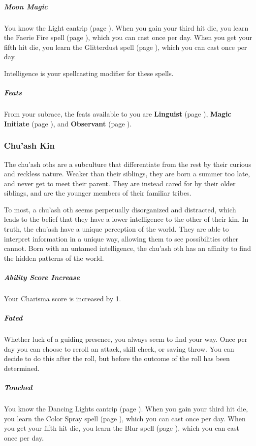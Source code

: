     \subparagraph{Moon Magic} You know the Light cantrip (page \pageref{spell::light}).
    When you gain your third hit die, you learn the Faerie Fire spell (page \pageref{spell::faeriefire}), which you can cast once per day.
    When you get your fifth hit die, you learn the Glitterdust spell (page \pageref{spell::glitterdust}), which you can cast once per day.

    Intelligence is your spellcasting modifier for these spells.

    \subparagraph{Feats} From your subrace, the feats available to you are
    \textbf{Linguist} (page \pageref{feat::linguist}),
    \textbf{Magic Initiate} (page \pageref{feat::magicinitiate}), and
    \textbf{Observant} (page \pageref{feat::observant}).

\subsubsection{Chu'ash Kin}
    The chu'ash oths are a subculture that differentiate from the rest by their curious and reckless nature.
    Weaker than their siblings, they are born a summer too late, and never get to meet their parent.
    They are instead cared for by their older siblings, and are the younger members of their familiar tribes.

    To most, a chu'ash oth seems perpetually disorganized and distracted, which leads to the belief that they have a lower intelligence to the other of their kin.
    In truth, the chu'ash have a unique perception of the world.
    They are able to interpret information in a unique way, allowing them to see possibilities other cannot.
    Born with an untamed intelligence, the chu'ash oth has an affinity to find the hidden patterns of the world.

    \subparagraph{Ability Score Increase} Your Charisma score is increased by 1.

    \subparagraph{Fated} Whether luck of a guiding presence, you always seem to find your way.
    Once per day you can choose to reroll an attack, skill check, or saving throw.
    You can decide to do this after the roll, but before the outcome of the roll has been determined.

    \subparagraph{Touched} You know the Dancing Lights cantrip (page \pageref{spell::dancinglights}).
    When you gain your third hit die, you learn the Color Spray spell (page \pageref{spell::colorspray}), which you can cast once per day.
    When you get your fifth hit die, you learn the Blur spell (page \pageref{spell::blur}), which you can cast once per day.

